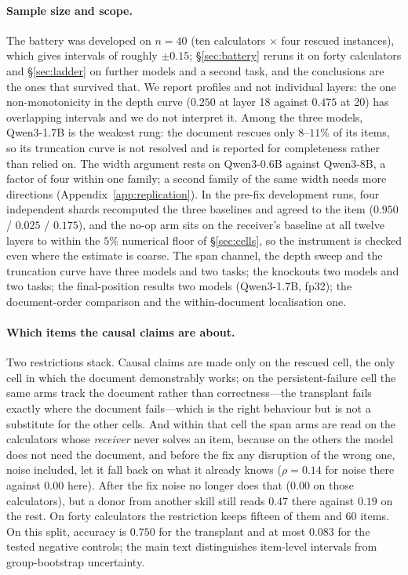 \documentclass{article}
\begin{document}
\paragraph{Sample size and scope.} The battery was developed on $n=40$ (ten
calculators $\times$ four rescued instances), which gives intervals of roughly
$\pm 0.15$; \S\ref{sec:battery} reruns it on forty calculators and
\S\ref{sec:ladder} on further models and a second task, and the conclusions are
the ones that survived that. We report profiles and not individual layers: the one
non-monotonicity in the depth curve ($0.250$ at layer 18 against $0.475$ at 20)
has overlapping intervals and we do not interpret it. Among the three models,
Qwen3-1.7B is the weakest rung: the document rescues only $8$--$11\%$ of its
items, so its truncation curve is not resolved and is reported for completeness
rather than relied on. The width argument rests on Qwen3-0.6B against Qwen3-8B,
a factor of four within one family; a second family of the same width needs
more directions (Appendix~\ref{app:replication}).
In the pre-fix development runs, four independent shards recomputed the three baselines and agreed to the item
($0.950$ / $0.025$ / $0.175$), and the no-op arm sits on the receiver's baseline
at all twelve layers to within the $5\%$ numerical floor of
\S\ref{sec:cells}, so the instrument is checked even where the estimate is
coarse. The span channel, the depth sweep and the truncation curve have three
models and two tasks; the knockouts two models and two tasks; the final-position
results two models (Qwen3-1.7B, fp32); the document-order comparison and the
within-document localisation one.

\paragraph{Which items the causal claims are about.} Two restrictions stack.
Causal claims are made only on the rescued cell, the only cell in which the
document demonstrably works; on the persistent-failure cell the same arms track
the document rather than correctness---the transplant fails exactly where the
document fails---which is the right behaviour but is not a substitute for the
other cells. And within that cell the span arms are read on the calculators
whose \emph{receiver} never solves an item, because on the others the model does
not need the document, and before the fix any disruption of the wrong one,
noise included, let it fall back on what it already knows ($\rho = 0.14$ for
noise there against $0.00$ here). After the fix noise no longer does that
($0.00$ on those calculators), but a donor from another skill still reads $0.47$
there against $0.19$ on the rest. On forty calculators the restriction keeps fifteen of them and
$60$ items. On this split, accuracy is $0.750$ for the transplant and at most
$0.083$ for the tested negative controls; the main text distinguishes item-level
intervals from group-bootstrap uncertainty.
\end{document}
